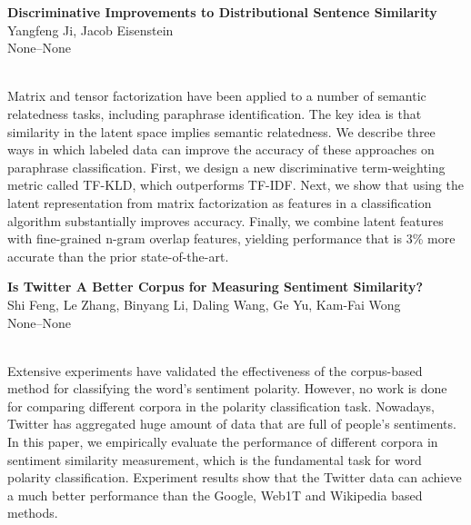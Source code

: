 \documentclass[twoside,makeidx]{book}
\renewcommand{\normalsize}{\fontsize{8}{9}\selectfont}
\renewcommand{\small}{\fontsize{7}{8}\selectfont}
\begin{document}
\par\vspace{2em}\noindent%
\begin{minipage}{\linewidth}%
\begin{center}
\textbf{\normalsize Discriminative Improvements to Distributional Sentence Similarity}\\
\normalsize  Yangfeng Ji,  Jacob Eisenstein\\
{\small None--None}\\
\end{center}
\end{minipage}\\[0.5em]
\nopagebreak%
\noindent%
{\small Matrix and tensor factorization have been applied to a number of semantic relatedness tasks, including paraphrase identification. The key idea is that similarity in the latent space implies semantic relatedness. We describe three ways in which labeled data can improve the accuracy of these approaches on paraphrase classification.  First, we design a new discriminative term-weighting metric called TF-KLD, which outperforms TF-IDF. Next, we show that using the latent representation from matrix factorization as features in a classification algorithm substantially improves accuracy. Finally, we combine latent features with fine-grained n-gram overlap features, yielding performance that is 3\% more accurate than the prior state-of-the-art.}
\par\vspace{2em}\noindent%
\begin{minipage}{\linewidth}%
\begin{center}
\textbf{\normalsize Is Twitter A Better Corpus for Measuring Sentiment Similarity?}\\
\normalsize  Shi Feng,  Le Zhang,  Binyang Li,  Daling Wang,  Ge Yu,  Kam-Fai Wong\\
{\small None--None}\\
\end{center}
\end{minipage}\\[0.5em]
\nopagebreak%
\noindent%
{\small Extensive experiments have validated the effectiveness of the corpus-based method for classifying the word's sentiment polarity. However, no work is done for comparing different corpora in the polarity classification task. Nowadays, Twitter has aggregated huge amount of data that are full of people's sentiments. In this paper, we empirically evaluate the performance of different corpora in sentiment similarity measurement, which is the fundamental task for word polarity classification. Experiment results show that the Twitter data can achieve a much better performance than the Google, Web1T and Wikipedia based methods.}
\end{document}
